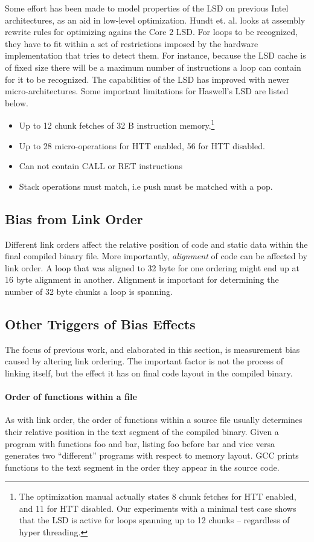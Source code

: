 \documentclass[a4paper,11pt,twocolumn,twoside]{article}
\begin{document}
Some effort has been made to model properties of the LSD on previous Intel architectures, as an aid in low-level optimization. 
Hundt et. al. \cite{Hundt:2011:MAO} looks at assembly rewrite rules for optimizing agains the Core 2 LSD.
For loops to be recognized, they have to fit within a set of restrictions imposed by the hardware implementation that tries to detect them. 
For instance, because the LSD cache is of fixed size there will be a maximum number of instructions a loop can contain for it to be recognized.
The capabilities of the LSD has improved with newer micro-architectures.
Some important limitations for Haswell's LSD are listed below.
\begin{itemize}
  \item Up to 12 chunk fetches of 32 B instruction memory.\footnote{The optimization manual actually states 8 chunk fetches for HTT enabled, and 11 for HTT disabled. Our experiments with a minimal test case shows that the LSD is active for loops spanning up to 12 chunks -- regardless of hyper threading.}
  \item Up to 28 micro-operations for HTT enabled, 56 for HTT disabled.
  \item Can not contain CALL or RET instructions
  \item Stack operations must match, i.e push must be matched with a pop.
\end{itemize}

\subsection{Bias from Link Order}
Different link orders affect the relative position of code and static data within the final compiled binary file.
More importantly, \emph{alignment} of code can be affected by link order.
A loop that was aligned to 32 byte for one ordering might end up at 16 byte alignment in another. 
Alignment is important for determining the number of 32 byte chunks a loop is spanning.

\subsection{Other Triggers of Bias Effects}
The focus of previous work, and elaborated in this section, is measurement bias caused by altering link ordering.
The important factor is not the process of linking itself, but the effect it has on final code layout in the compiled binary. 

\paragraph{Order of functions within a file}
As with link order, the order of functions within a source file usually determines their relative position in the text segment of the compiled binary. 
Given a program with functions foo and bar, listing foo before bar and vice versa generates two “different” programs with respect to memory layout. 
GCC prints functions to the text segment in the order they appear in the source code.
\end{document}
